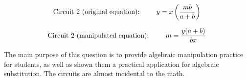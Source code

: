 $$\hbox{Circuit 2 (original equation): \hskip 20pt} y = x \left( {mb \over a+b} \right)$$

$$\hbox{Circuit 2 (manipulated equation): \hskip 20pt} m = {{y(a + b)} \over {bx}}$$







The main purpose of this question is to provide algebraic manipulation practice for students, as well as shown them a practical application for algebraic substitution.  The circuits are almost incidental to the math.




